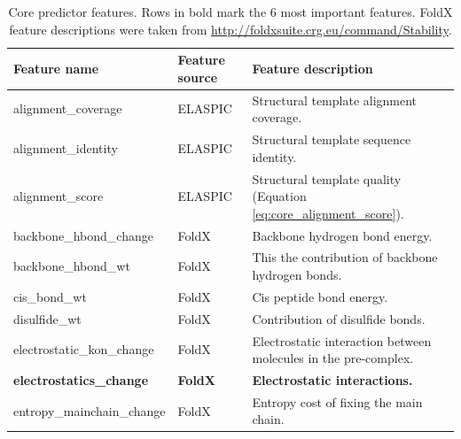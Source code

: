 \clearpage

\begin{table}[tb]
	\centering
	\caption[Features selected for the core predictor.]{
		Core predictor features.
		Rows in bold mark the 6 most important features.
		FoldX feature descriptions were taken from \url{http://foldxsuite.crg.eu/command/Stability}.
	}
	\label{tab:core_features}
	\begin{tabular}{ l | l | p{7cm} }
		\toprule
		Feature name                              & Feature source   & Feature description                                                                                 \\
		\midrule
		alignment\_coverage                       & ELASPIC          & Structural template alignment coverage.                                                             \\
		alignment\_identity                       & ELASPIC          & Structural template sequence identity.                                                              \\
		alignment\_score                          & ELASPIC          & Structural template quality (Equation \ref{eq:core_alignment_score}).                               \\
		backbone\_hbond\_change                   & FoldX            & Backbone hydrogen bond energy.                                                                      \\
		backbone\_hbond\_wt                       & FoldX            & This the contribution of backbone hydrogen bonds.                                                   \\
		cis\_bond\_wt                             & FoldX            & Cis peptide bond energy.                                                                            \\
		disulfide\_wt                             & FoldX            & Contribution of disulfide bonds.                                                                    \\
		electrostatic\_kon\_change                & FoldX            & Electrostatic interaction between molecules in the pre-complex.                                     \\
		\textbf{electrostatics\_change}           & \textbf{FoldX}   & \textbf{Electrostatic interactions.}                                                                \\
		entropy\_mainchain\_change                & FoldX            & Entropy cost of fixing the main chain.                                                              \\

\end{tabular}
\end{table}
